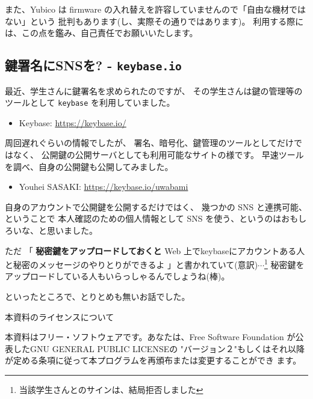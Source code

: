 \documentclass[mingoth,a4paper]{jsarticle}
\begin{document}
また、Yubico は firmware の入れ替えを許容していませんので「自由な機材ではない」という
批判もあります(し、実際その通りではあります)。
利用する際には、この点を鑑み、自己責任でお願いいたします。

\subsection{鍵署名にSNSを? - \texttt{keybase.io}}

最近、学生さんに鍵署名を求められたのですが、
その学生さんは鍵の管理等のツールとして \texttt{keybase} を利用していました。
\begin{itemize}
\item Keybase: \url{https://keybase.io/}
\end{itemize}

周回遅れぐらいの情報でしたが、
署名、暗号化、鍵管理のツールとしてだけではなく、
公開鍵の公開サーバとしても利用可能なサイトの様です。
早速ツールを調べ、自身の公開鍵も公開してみました。
\begin{itemize}
\item Youhei SASAKI: \url{https://keybase.io/uwabami}
\end{itemize}
自身のアカウントで公開鍵を公開するだけではく、
幾つかの SNS と連携可能、ということで
本人確認のための個人情報として SNS を使う、というのはおもしろいな、と思いました。

ただ
「
\textbf{秘密鍵をアップロードしておくと}
Web 上でkeybaseにアカウントある人と秘密のメッセージのやりとりができるよ
」と書かれていて(意訳)$\cdots$\footnote{%
  当該学生さんとのサインは、結局拒否しました
}
%
秘密鍵をアップロードしている人もいらっしゃるんでしょうね(棒)。

といったところで、とりとめも無いお話でした。

\pagebreak

\mbox{}\newpage
\mbox{}\newpage

\pagebreak

\begin{center}
本資料のライセンスについて
\end{center}

本資料はフリー・ソフトウェアです。あなたは、Free Software
Foundation が公表したGNU GENERAL PUBLIC LICENSEの "バージョン２"もしくはそれ以降
が定める条項に従って本プログラムを再頒布または変更することができ
ます。
\end{document}
